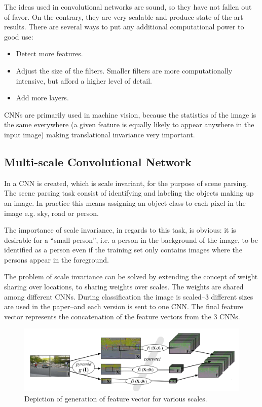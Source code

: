 \documentclass[11pt]{article}
\begin{document}
The ideas used in convolutional networks are sound, so they have not fallen out of favor.  On the contrary, they are very scalable and produce state-of-the-art results.  There are several ways to put any additional computational power to good use:
\begin{itemize}
 \item Detect more features.
 \item Adjust the size of the filters.  Smaller filters are more computationally intensive, but afford a higher level of detail.
 \item Add more layers.
\end{itemize}

CNNs are primarily used in machine vision, because the statistics of the image is the same everywhere (a given feature is equally likely to appear anywhere in the input image) making translational invariance very important.

\subsection{Multi-scale Convolutional Network}

In \cite{farabet} a CNN is created, which is scale invariant, for the purpose of scene parsing.  The scene parsing task consist of identifying and labeling the objects making up an image.  In practice this means assigning an object class to each pixel in the image e.g. sky, road or person.

The importance of scale invariance, in regards to this task, is obvious: it is desirable for a ``small person'', i.e. a person in the background of the image, to be identified as a person even if the training set only contains images where the persons appear in the foreground.

The problem of scale invariance can be solved by extending the concept of weight sharing over locations, to sharing weights over scales.  The weights are shared among different CNNs.  During classification the image is scaled--3 different sizes are used in the paper--and each version is sent to one CNN.  The final feature vector represents the concatenation of the feature vectors from the 3 CNNs.

\begin{figure}[htb]
  \centering
  \includegraphics[width=\textwidth]{mymscnn.png}
  \caption{Depiction of generation of feature vector for various scales.}
  \label{fig:mscn}
\end{figure}
\end{document}

